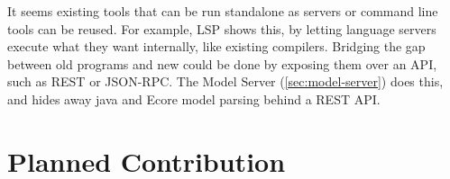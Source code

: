 It seems existing tools that can be run standalone as servers or command line tools can be reused.
For example, \gls{LSP} shows this, by letting language servers execute what they want internally, like existing compilers.
Bridging the gap between old programs and new could be done by exposing them over an \gls{API}, such as \gls{REST} or \gls{JSON-RPC}. The Model Server (\cref{sec:model-server}) does this, and hides away java and \gls{Ecore} model parsing behind a \gls{REST} \acrshort{API}.


\section{Planned Contribution}%

\begin{questions}[leftmargin=1cm,resume]
  \item \emph{}\label{rq:21}
  \begin{questions}
    \item \emph{}\label{rq:22}
    \item \emph{}\label{rq:23}
    \item \emph{}\label{rq:24}
    \item \emph{}\label{rq:25}
    \item \emph{}\label{rq:26}
  \end{questions}
\end{questions}
